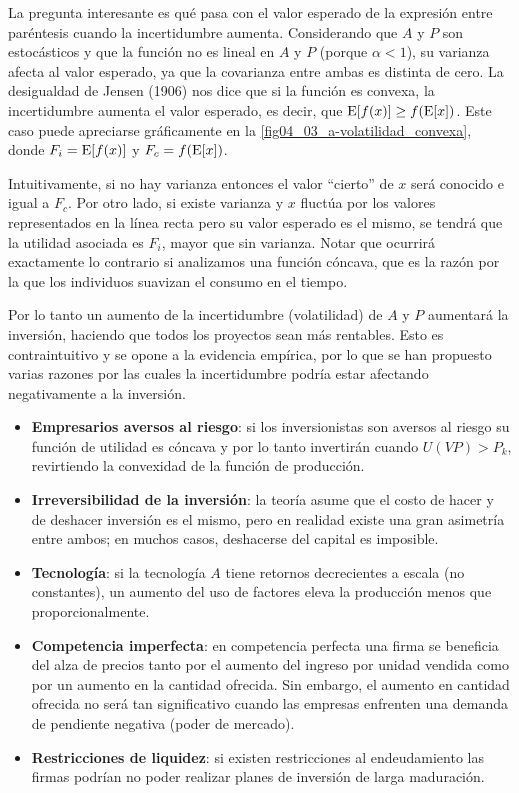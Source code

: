 \documentclass[DeGregorioResumen]{subfiles}
\begin{document}
La pregunta interesante es qué pasa con el valor esperado de la expresión entre paréntesis cuando la incertidumbre aumenta. Considerando que $A$ y $P$ son estocásticos y que la función no es lineal en $A$ y $P$ (porque $\alpha<1$), su varianza afecta al valor esperado, ya que la covarianza entre ambas es distinta de cero. La desigualdad de Jensen (1906) nos dice que si la función es convexa, la incertidumbre aumenta el valor esperado, es decir, que $\operatorname{E}[f(x)] \geq f(\operatorname{E}[x])$. Este caso puede apreciarse gráficamente en la \autoref{fig04_03_a-volatilidad_convexa}, donde $F_i=\operatorname{E}[f(x)]$ y $F_c=f(\operatorname{E}[x])$.



Intuitivamente, si no hay varianza entonces el valor ``cierto'' de $x$ será conocido e igual a $F_c$. Por otro lado, si existe varianza y $x$ fluctúa por los valores representados en la línea recta pero su valor esperado es el mismo, se tendrá que la utilidad asociada es $F_i$, mayor que sin varianza. Notar que ocurrirá exactamente lo contrario si analizamos una función cóncava, que es la razón por la que los individuos suavizan el consumo en el tiempo.

Por lo tanto un aumento de la incertidumbre (volatilidad) de $A$ y $P$ aumentará la inversión, haciendo que todos los proyectos sean más rentables. Esto es contraintuitivo y se opone a la evidencia empírica, por lo que se han propuesto varias razones por las cuales la incertidumbre podría estar afectando negativamente a la inversión.

\begin{itemize}
\item \textbf{Empresarios aversos al riesgo}: si los inversionistas son aversos al riesgo su función de utilidad es cóncava y por lo tanto invertirán cuando $U(VP)>P_k$, revirtiendo la convexidad de la función de producción.
\item \textbf{Irreversibilidad de la inversión}: la teoría asume que el costo de hacer y de deshacer inversión es el mismo, pero en realidad existe una gran asimetría entre ambos; en muchos casos, deshacerse del capital es imposible. 
\item \textbf{Tecnología}: si la tecnología $A$ tiene retornos decrecientes a escala (no constantes), un aumento del uso de factores eleva la producción menos que proporcionalmente.
\item \textbf{Competencia imperfecta}: en competencia perfecta una firma se beneficia del alza de precios tanto por el aumento del ingreso por unidad vendida como por un aumento en la cantidad ofrecida. Sin embargo, el aumento en cantidad ofrecida no será tan significativo cuando las empresas enfrenten una demanda de pendiente negativa (poder de mercado).
\item \textbf{Restricciones de liquidez}: si existen restricciones al endeudamiento las firmas podrían no poder realizar planes de inversión de larga maduración.
\end{itemize}
\end{document}
